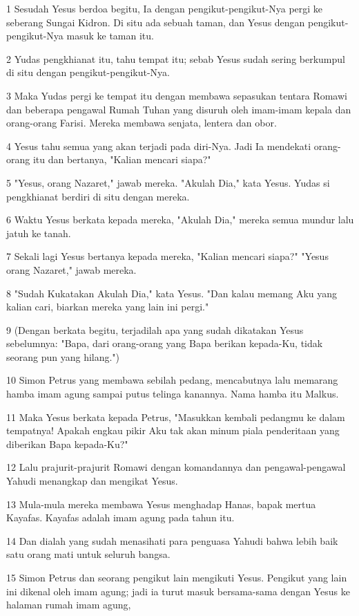 \par 1 Sesudah Yesus berdoa begitu, Ia dengan pengikut-pengikut-Nya pergi ke seberang Sungai Kidron. Di situ ada sebuah taman, dan Yesus dengan pengikut-pengikut-Nya masuk ke taman itu.
\par 2 Yudas pengkhianat itu, tahu tempat itu; sebab Yesus sudah sering berkumpul di situ dengan pengikut-pengikut-Nya.
\par 3 Maka Yudas pergi ke tempat itu dengan membawa sepasukan tentara Romawi dan beberapa pengawal Rumah Tuhan yang disuruh oleh imam-imam kepala dan orang-orang Farisi. Mereka membawa senjata, lentera dan obor.
\par 4 Yesus tahu semua yang akan terjadi pada diri-Nya. Jadi Ia mendekati orang-orang itu dan bertanya, "Kalian mencari siapa?"
\par 5 "Yesus, orang Nazaret," jawab mereka. "Akulah Dia," kata Yesus. Yudas si pengkhianat berdiri di situ dengan mereka.
\par 6 Waktu Yesus berkata kepada mereka, "Akulah Dia," mereka semua mundur lalu jatuh ke tanah.
\par 7 Sekali lagi Yesus bertanya kepada mereka, "Kalian mencari siapa?" "Yesus orang Nazaret," jawab mereka.
\par 8 "Sudah Kukatakan Akulah Dia," kata Yesus. "Dan kalau memang Aku yang kalian cari, biarkan mereka yang lain ini pergi."
\par 9 (Dengan berkata begitu, terjadilah apa yang sudah dikatakan Yesus sebelumnya: "Bapa, dari orang-orang yang Bapa berikan kepada-Ku, tidak seorang pun yang hilang.")
\par 10 Simon Petrus yang membawa sebilah pedang, mencabutnya lalu memarang hamba imam agung sampai putus telinga kanannya. Nama hamba itu Malkus.
\par 11 Maka Yesus berkata kepada Petrus, "Masukkan kembali pedangmu ke dalam tempatnya! Apakah engkau pikir Aku tak akan minum piala penderitaan yang diberikan Bapa kepada-Ku?"
\par 12 Lalu prajurit-prajurit Romawi dengan komandannya dan pengawal-pengawal Yahudi menangkap dan mengikat Yesus.
\par 13 Mula-mula mereka membawa Yesus menghadap Hanas, bapak mertua Kayafas. Kayafas adalah imam agung pada tahun itu.
\par 14 Dan dialah yang sudah menasihati para penguasa Yahudi bahwa lebih baik satu orang mati untuk seluruh bangsa.
\par 15 Simon Petrus dan seorang pengikut lain mengikuti Yesus. Pengikut yang lain ini dikenal oleh imam agung; jadi ia turut masuk bersama-sama dengan Yesus ke halaman rumah imam agung,
